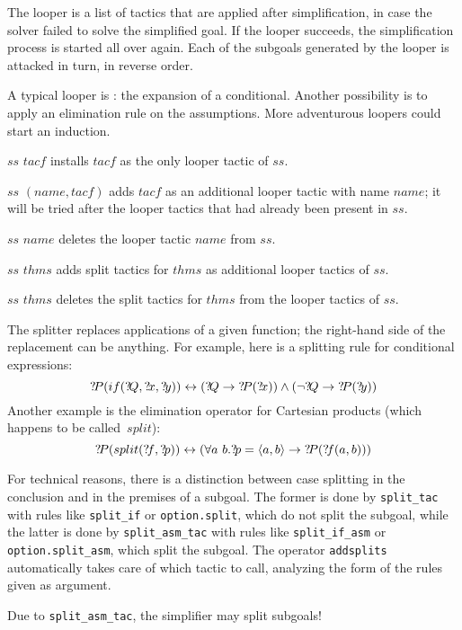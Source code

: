The looper is a list of tactics that are applied after simplification, in case
the solver failed to solve the simplified goal.  If the looper
succeeds, the simplification process is started all over again.  Each
of the subgoals generated by the looper is attacked in turn, in
reverse order.

A typical looper is : the expansion of a conditional.
Another possibility is to apply an elimination rule on the
assumptions.  More adventurous loopers could start an induction.

\begin{ttdescription}
  
\item[$ss$ \ttindexbold{setloop} $tacf$] installs $tacf$ as the only looper
  tactic of $ss$.
  
\item[$ss$ \ttindexbold{addloop} $(name,tacf)$] adds $tacf$ as an additional
  looper tactic with name $name$; it will be tried after the looper tactics
  that had already been present in $ss$.
  
\item[$ss$ \ttindexbold{delloop} $name$] deletes the looper tactic $name$
  from $ss$.
  
\item[$ss$ \ttindexbold{addsplits} $thms$] adds
  split tactics for $thms$ as additional looper tactics of $ss$.

\item[$ss$ \ttindexbold{addsplits} $thms$] deletes the
  split tactics for $thms$ from the looper tactics of $ss$.

\end{ttdescription}

The splitter replaces applications of a given function; the right-hand side
of the replacement can be anything.  For example, here is a splitting rule
for conditional expressions:
\[ \Var{P}(if(\Var{Q},\Var{x},\Var{y})) \bimp (\Var{Q} \imp \Var{P}(\Var{x}))
\conj (\neg\Var{Q} \imp \Var{P}(\Var{y})) 
\] 
Another example is the elimination operator for Cartesian products (which
happens to be called~$split$):  
\[ {?\!P}(split({?\!f},{?\!p})) \leftrightarrow (\forall a~b. {?\!p} =
\langle a,b\rangle \rightarrow {?\!P}({?\!f}(a,b))) 
\] 

For technical reasons, there is a distinction between case splitting in the 
conclusion and in the premises of a subgoal. The former is done by
\texttt{split_tac} with rules like \texttt{split_if} or \texttt{option.split}, 
which do not split the subgoal, while the latter is done by 
\texttt{split_asm_tac} with rules like \texttt{split_if_asm} or 
\texttt{option.split_asm}, which split the subgoal.
The operator \texttt{addsplits} automatically takes care of which tactic to
call, analyzing the form of the rules given as argument.
\begin{warn}
Due to \texttt{split_asm_tac}, the simplifier may split subgoals!
\end{warn}

